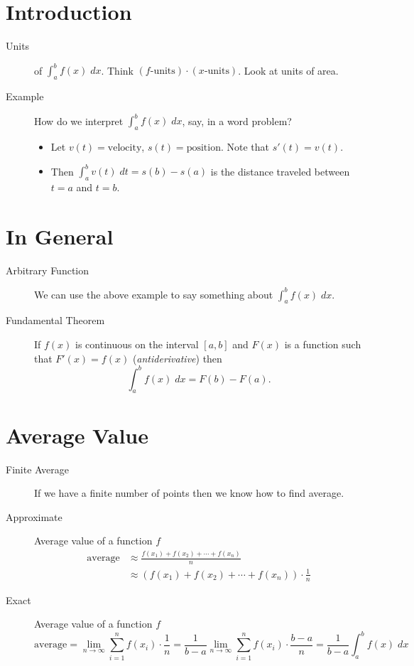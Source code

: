 \documentclass[11pt]{article}
\newcommand{\ds}{\displaystyle}
\begin{document}
\drawtitle

\section*{Introduction}
\begin{description}

\item[Units] of $\ds\int_a^b f(x)\;dx$.  Think
  $(f\text{-units})\cdot(x\text{-units})$.  Look at units of area.
\item[Example] How do we interpret $\ds\int_a^b f(x)\;dx$, say, in a
  word problem?
  \begin{itemize}
  \item Let $v(t)=\text{velocity}$, $s(t)=\text{position}$. Note that $s'(t) = v(t)$.
  \item Then $\int_a^b v(t)\;dt = s(b) - s(a)$ is the distance traveled between
    $t=a$ and $t=b$.
  \end{itemize}

\end{description}

\section*{In General}
\begin{description}
\item[Arbitrary Function] We can use the above example to say
  something about $\int_a^b f(x)\;dx$.
\item[Fundamental Theorem] If $f(x)$ is continuous on the interval
  $[a,b]$ and $F(x)$ is a function such that $F'(x)=f(x)$
  (\textit{antiderivative}) then
  \[
  \int_a^b f(x)\;dx = F(b)-F(a).
  \]
\end{description}

\section*{Average Value}

\begin{description}
\item[Finite Average] If we have a finite number of points then we
  know how to find average.
\item[Approximate] Average value of a function $f$
  \begin{align*}
    \text{average} &\approx \frac{f(x_1) + f(x_2) + \cdots + f(x_n)}{n}\\
    &\approx \left(f(x_1) + f(x_2) + \cdots + f(x_n)\right)\cdot\frac{1}{n}
  \end{align*}

\item[Exact] Average value of a function $f$
  \[
  \text{average} = \lim_{n\to\infty} \sum_{i=1}^n f(x_i)\cdot\frac{1}{n}
  = \frac{1}{b-a}\lim_{n\to\infty}\sum_{i=1}^n f(x_i)\cdot\frac{b-a}{n}
  = \frac{1}{b-a}\int_a^b f(x)\; dx
  \]
\end{description}
\end{document}
